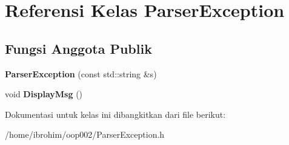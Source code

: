 \hypertarget{classParserException}{}\section{Referensi Kelas Parser\+Exception}
\label{classParserException}
\subsection*{Fungsi Anggota Publik}
\begin{DoxyCompactItemize}
\item 
\hypertarget{classParserException_a73e9c79df9bacd24553686e317461a18}{}{\bfseries Parser\+Exception} (const std\+::string \&s)\label{classParserException_a73e9c79df9bacd24553686e317461a18}

\item 
\hypertarget{classParserException_a67db03e39544827abd7a5d94a09818ec}{}void {\bfseries Display\+Msg} ()\label{classParserException_a67db03e39544827abd7a5d94a09818ec}

\end{DoxyCompactItemize}


Dokumentasi untuk kelas ini dibangkitkan dari file berikut\+:\begin{DoxyCompactItemize}
\item 
/home/ibrohim/oop002/Parser\+Exception.\+h\end{DoxyCompactItemize}
